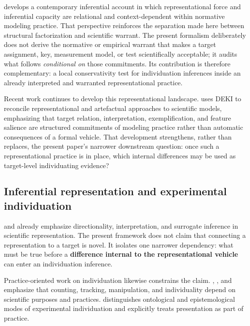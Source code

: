 \documentclass[11pt]{article}
\begin{document}
\citet{Suarez2024InferenceRepresentation} develops a contemporary inferential account in which representational force and inferential capacity are relational and context-dependent within normative modeling practice. That perspective reinforces the separation made here between structural factorization and scientific warrant. The present formalism deliberately does not derive the normative or empirical warrant that makes a target assignment, key, measurement model, or test scientifically acceptable; it audits what follows \emph{conditional on} those commitments. Its contribution is therefore complementary: a local conservativity test for individuation inferences inside an already interpreted and warranted representational practice.

Recent work continues to develop this representational landscape. \citet{Sartori2026Artefactualism} uses DEKI to reconcile representational and artefactual approaches to scientific models, emphasizing that target relation, interpretation, exemplification, and feature salience are structured commitments of modeling practice rather than automatic consequences of a formal vehicle. That development strengthens, rather than replaces, the present paper's narrower downstream question: once such a representational practice is in place, which internal differences may be used as target-level individuating evidence?

\subsection{Inferential representation and experimental individuation}

\citet{Suarez2004Inferential} and \citet{Contessa2007Surrogative} already emphasize directionality, interpretation, and surrogate inference in scientific representation. The present framework does not claim that connecting a representation to a target is novel. It isolates one narrower dependency: what must be true before a \textbf{difference internal to the representational vehicle} can enter an individuation inference.

Practice-oriented work on individuation likewise constrains the claim. \citet{BuenoChenFagan2018}, \citet{Waters2018AskNot}, and \citet{Love2018ExperimentalPractice} emphasize that counting, tracking, manipulation, and individuality depend on scientific purposes and practices. \citet{Chen2018ExperimentalIndividuation} distinguishes ontological and epistemological modes of experimental individuation and explicitly treats presentation as part of practice.
\end{document}
